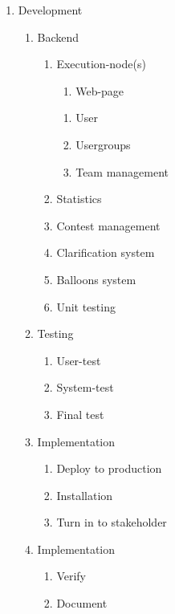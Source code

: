 \begin{mdframed}
\begin{enumerate}
        \item Development
        \begin{enumerate}
            \item  Backend
            \begin{enumerate}
                \item Execution-node(s)
                \begin{enumerate}
                    \item Web-page
                \end{enumerate}
            \begin{enumerate}
                \item User
                \item Usergroups
                \item Team management
            \end{enumerate}
            \item  Statistics
            \item Contest management 
            \item Clarification system
            \item Balloons system
            \item Unit testing
        \end{enumerate}

        \item Testing
        \begin{enumerate}
            \item  User-test
            \item System-test  
            \item Final test
        \end{enumerate}

        \item Implementation
        \begin{enumerate}
            \item  Deploy to production
            \item Installation
            \item Turn in to stakeholder
        \end{enumerate}

        \item Implementation
        \begin{enumerate}
            \item Verify
            \item Document
        \end{enumerate}
    \end{enumerate}
    \end{enumerate}
\end{mdframed}
\endgroup

